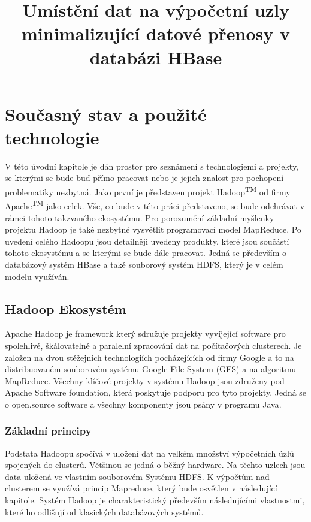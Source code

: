 \documentclass[thesis=M,czech]{FITthesis}[2012/06/26]
\title{Umístění dat na výpočetní uzly minimalizující datové přenosy v databázi HBase}
\begin{document}
\lstset{language=sh}  

\begin{introduction}

\end{introduction}

\chapter{Současný stav a použité technologie}
V této úvodní kapitole je dán prostor pro seznámení s technologiemi a projekty, se kterými se bude buď přímo pracovat nebo je jejich znalost pro pochopení problematiky nezbytná. Jako první je představen projekt Hadoop\textsuperscript{TM} od firmy Apache\textsuperscript{TM} jako celek. Vše, co bude v této práci představeno, se bude odehrávat v rámci tohoto takzvaného ekosystému. Pro porozumění základní myšlenky projektu Hadoop je také nezbytné vysvětlit programovací model MapReduce. Po uvedení celého Hadoopu jsou detailněji uvedeny produkty, které jsou součástí tohoto ekosystému a se kterými se bude dále pracovat. Jedná se především o databázový systém HBase a také souborový systém HDFS, který je v celém modelu využíván. 


\section{Hadoop Ekosystém}
Apache Hadoop je framework který sdružuje projekty  vyvíjející software pro spolehlivé, škálovatelné a paralelní zpracování dat na počítačových clusterech. Je založen na dvou stěžejních  technologiích pocházejících od firmy Google  a to na distribuovaném souborovém systému Google File System (GFS) a na algoritmu MapReduce\cite{HadoopDum}. Všechny klíčové projekty v systému Hadoop jsou združeny  pod Apache Software foundation, která poskytuje podporu pro tyto projekty. Jedná se o open.source software a všechny komponenty jsou psány v programu Java.

\subsection{Základní principy}
Podstata Hadoopu spočívá v uložení dat na velkém množství výpočetních úzlů spojených do clusterů. Většinou se jedná o běžný hardware. Na těchto uzlech jsou data uložená ve vlastním souborovém Systému HDFS. K výpočtům nad clusterem se využívá princip Mapreduce, který bude osvětlen v následující kapitole. Systém Hadoop je charakteristický především následujícími vlastnostmi, které ho odlišují od klasických databázových systémů.
\end{document}
